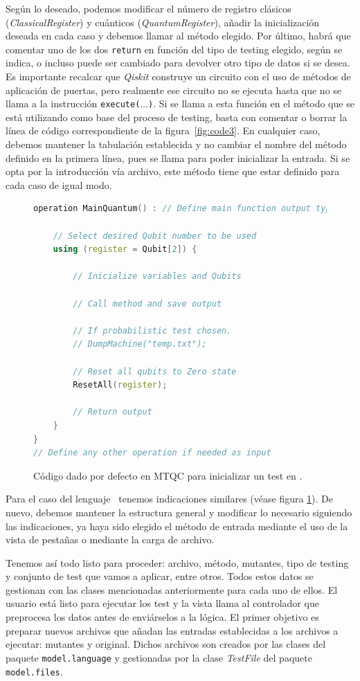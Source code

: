 Según lo deseado, podemos modificar el número de registro clásicos (\textit{ClassicalRegister}) y cuánticos (\textit{QuantumRegister}), añadir la inicialización deseada en cada caso y debemos llamar al método elegido. Por último, habrá que comentar uno de los dos \texttt{return} en función del tipo de testing elegido, según se indica, o incluso puede ser cambiado para devolver otro tipo de datos si se desea. Es importante recalcar que \textit{Qiskit} construye un circuito con el uso de métodos de aplicación de puertas, pero realmente ese circuito no se ejecuta hasta que no se llama a la instrucción \texttt{execute($\ldots$)}. Si se llama a esta función  en el método que se está utilizando como base del proceso de testing, basta con comentar o borrar la línea de código correspondiente de la figura~\ref{fig:code3}.
%
En cualquier caso, debemos mantener la tabulación establecida y no cambiar el nombre del método definido en la primera línea, pues se llama para poder  inicializar la entrada. Si se opta por la introducción vía archivo, este método tiene que estar definido para cada caso de igual modo.

\begin{figure}[tb]
\begin{lstlisting}[language=c++]
operation MainQuantum() : // Define main function output type {

	// Select desired Qubit number to be used
	using (register = Qubit[2]) {

    	// Inicialize variables and Qubits

    	// Call method and save output

    	// If probabilistic test chosen.
    	// DumpMachine("temp.txt");

    	// Reset all qubits to Zero state
    	ResetAll(register);

    	// Return output
	}
}
// Define any other operation if needed as input
\end{lstlisting}
\caption{Código dado por defecto en MTQC para inicializar un test en \qsh.}
\label{fig:code4}
\end{figure}

Para el caso del lenguaje \qsh\ tenemos indicaciones similares (véase figura \ref{fig:code4}). De nuevo, debemos mantener la estructura general y modificar lo necesario siguiendo las indicaciones, ya haya sido elegido el método de entrada mediante el uso de la vista de pestañas o mediante la carga de archivo.

Tenemos así todo listo para proceder: archivo, método, mutantes, tipo de testing y conjunto de test que vamos a aplicar, entre otros. Todos estos datos se gestionan con las clases mencionadas anteriormente para cada uno de ellos. El usuario está listo para ejecutar los test y la vista llama al controlador que preprocesa los datos antes de enviárselos a la lógica. El primer objetivo es preparar nuevos archivos que añadan las entradas establecidas a los archivos a ejecutar: mutantes y original. Dichos archivos son creados por las clases del paquete \texttt{model.language} y gestionadas por la clase \textit{TestFile} del paquete \texttt{model.files}.


